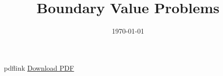 \documentclass[11pt]{article}
\title{Boundary Value Problems}
\author{}
\date{\today}
\begin{document}
\maketitle
\begin{warpHTML}
\begin{BlockClass}{pdflink}
\href{boundary-value.pdf}{Download PDF}
\end{BlockClass}
\end{warpHTML}
\tableofcontents

\end{document}
